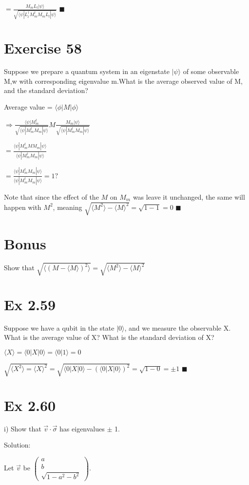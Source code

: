 \documentclass{article}
\newcommand{\0}{{$|0\rangle$}}
\newcommand{\1}{{$|1\rangle$}}
\newcommand{\2}{\frac{1}{\sqrt{2}}}
\newcommand{\psik}{|\psi\rangle}
\newcommand{\psib}{\langle\psi|}
\begin{document}
$ = \frac{M_m L_l \psik}{\sqrt{\psib L_l^\dag M_m^\dag M_m L_l \psik}}$ 
$\blacksquare$

\newpage
\section*{Exercise 58}
Suppose we prepare a quantum system in an eigenstate $\psik$ of some observable M,w with corresponding eigenvalue m.What is the average observed value of M, and the standard deviation?

Average value = $\langle \phi | M | \phi \rangle$

$\Rightarrow \frac{\psib M_m^\dag}{\sqrt{\psib M_m^\dag M_m \psik}} M \frac{M_m \psik}{\sqrt{\psib M_m^\dag M_m \psik}}$

$ = \frac{\psib M_m^\dag M M_m \psik}{\psib M_m^\dag M_m \psik} $

$ = \frac{\psib M_m^\dag M_m \psik}{\psib M_m^\dag M_m \psik} = 1?$

Note that since the effect of the $M \text{ on } M_m$ was leave it unchanged, the same will happen with $M^2$, meaning $\sqrt{\langle M^2 \rangle - \langle M \rangle^2} = \sqrt{1 - 1} = 0$
$\blacksquare$
\section*{Bonus}
Show that $\sqrt{\langle (M - \langle M \rangle)^2\rangle} =  \sqrt{\langle M^2 \rangle - \langle M \rangle ^2}$

\newpage
\section*{Ex 2.59}
Suppose we have a qubit in the state \0, and we measure the observable X. What is the average value of X? What is the standard deviation of X?

$\langle X \rangle = \langle 0 | X | 0 \rangle = \langle 0 | 1 \rangle = 0$

$\sqrt{\langle X^2 \rangle = \langle X \rangle ^2} = \sqrt{\langle 0 | X | 0 \rangle  - (\langle 0 | X | 0 \rangle)^2}  = \sqrt{1 - 0} = \pm 1$
$\blacksquare$

\newpage
\section*{Ex 2.60}
i) Show that $\vec{v} \cdot \vec{\sigma}$ has eigenvalues $\pm$ 1. 

Solution:

Let $\vec{v}$ be $\begin{pmatrix} a \\ b \\ \sqrt{1 - a^2 -b^2} \end{pmatrix}$.
\end{document}
